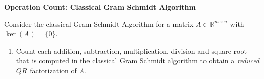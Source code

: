 \textbf{Operation Count: Classical Gram Schmidt Algorithm}

Consider the classical Gram-Schmidt Algorithm for a matrix $A \in \mathbb{R}^{m \times n}$ with $\ker(A) = \{0\}$. 
\begin{enumerate}
	\item Count each addition, subtraction, multiplication, division and square root that is computed in the classical Gram Schmidt algorithm to obtain a \textit{reduced} $QR$ factorization of $A$. 
\end{enumerate}

